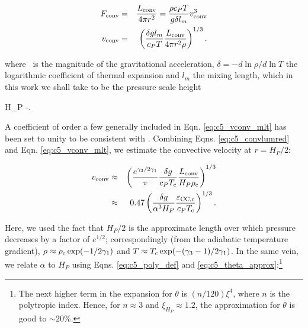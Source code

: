 \begin{eqnarray}
\Fconv &=& \frac{\Lconv}{4\pi r^2} = \frac{\rho c_PT}{\gacc\delta l_m} \vconv^3 \nonumber \\
\vconv &=& \left(\frac{\delta \gacc l_m}{c_P T}\frac{\Lconv}{4\pi r^2 \rho}\right)^{1/3}.
\label{eq:c5_vconv_mlt}
\end{eqnarray}


\noindent where \gacc\ is the magnitude of the gravitational acceleration, $\delta = -d\ln\rho/d\ln T$ the logarithmic coefficient of thermal expansion and $l_m$ the mixing length, which in this work we shall take to be the pressure scale height

\eqbegin
H_P \equiv -.
\label{eq:c5_scaleheight}
\eqend

\noindent A coefficient of order a few generally included in Eqn. \ref{eq:c5_vconv_mlt} has been set to unity to be consistent with \citeal{piroc08}.  Combining Eqns. \ref{eq:c5_convlumred} and Eqn. \ref{eq:c5_vconv_mlt}, we estimate the convective velocity at $r = H_P/2$:

\begin{eqnarray}
\vconv &\approx& \left(\frac{e^{\gamma_3/2\gamma_1}}{\pi}\frac{\delta \gacc}{c_P \Tc}\frac{\Lconv}{H_P \rhoc}\right)^{1/3} \nonumber \\
	&\approx& 0.47\left(\frac{\delta \gacc}{\alpha^3H_P}\frac{\epscentral}{c_P \Tc}\right)^{1/3}.
\label{eq:c5_vconvest}
\end{eqnarray}


\noindent Here, we used the fact that $H_P/2$ is the approximate length over which pressure decreases by a factor of $e^{1/2}$; correspondingly (from the adiabatic temperature gradient), $\rho \approx \rhoc\exp(-1/2\gamma_1)$ and $T \approx \Tc\exp(-(\gamma_3 - 1)/2\gamma_1)$.  In the same vein, we relate $\alpha$ to $H_P$ using Eqns. \ref{eq:c5_poly_def} and \ref{eq:c5_theta_approx}:\footnote{The next higher term in the expansion for $\theta$ is $(n/120)\xi^4$, where $n$ is the polytropic index.  Hence, for $n \approx 3$ and $\xi_{H_P} \approx 1.2$, the approximation for $\theta$ is good to $\sim20$\%.}

